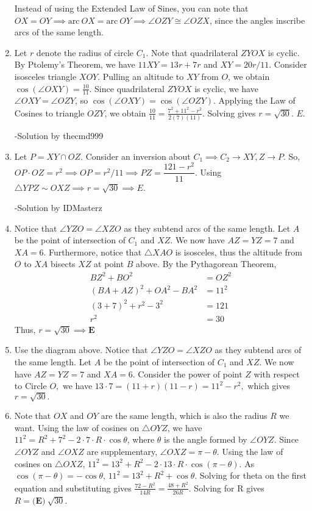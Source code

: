 \documentclass{article}%
\begin{document}
\begin{enumerate}
Instead of using the Extended Law of Sines, you can note that $OX = OY \implies \text{arc}\ OX =\text{arc}\ OY \implies \angle{OZY} \cong \angle{OZX}$, since the angles inscribe arcs of the same length.

%
\item%
Let $r$ denote the radius of circle $C_1$. Note that quadrilateral $ZYOX$ is cyclic. By Ptolemy's Theorem, we have $11XY=13r+7r$ and $XY=20r/11$. Consider isosceles triangle $XOY$. Pulling an altitude to $XY$ from $O$, we obtain $\cos(\angle{OXY}) = \frac{10}{11}$. Since quadrilateral $ZYOX$ is cyclic, we have $\angle{OXY}=\angle{OZY}$, so $\cos(\angle{OXY}) = \cos(\angle{OZY})$. Applying the Law of Cosines to triangle $OZY$, we obtain $\frac{10}{11} = \frac{7^2+11^2-r^2}{2(7)(11)}$. Solving gives $r=\sqrt{30}$. $\boxed{E}$.

-Solution by thecmd999

%
\item%
Let $P = XY \cap OZ$. Consider an inversion about $C_1 \implies C_2 \to XY, Z \to P$. So,  $OP \cdot OZ = r^2 \implies OP = r^2/11 \implies PZ = \dfrac{121 - r^2}{11}$. Using $\triangle YPZ \sim OXZ \implies  r = \sqrt{30} \implies \boxed{E}$.


-Solution by IDMasterz

%
\item%
Notice that $\angle YZO=\angle XZO$ as they subtend arcs of the same length. Let $A$ be the point of intersection of $C_1$ and $XZ$. We now have $AZ=YZ=7$ and $XA=6$. Furthermore, notice that $\triangle XAO$ is isosceles, thus the altitude from $O$ to $XA$ bisects $XZ$ at point $B$ above. By the Pythagorean Theorem, \begin{align*}BZ^2+BO^2&=OZ^2\\(BA+AZ)^2+OA^2-BA^2&=11^2\\(3+7)^2+r^2-3^2&=121\\r^2&=30\end{align*}Thus, $r=\sqrt{30}\implies\boxed{\textbf{E}}$

%
\item%
Use the diagram above. Notice that $\angle YZO=\angle XZO$ as they subtend arcs of the same length. Let $A$ be the point of intersection of $C_1$ and $XZ$. We now have $AZ=YZ=7$ and $XA=6$. Consider the power of point $Z$ with respect to Circle $O,$ we have $13\cdot 7 = (11 + r)(11 - r) = 11^2 - r^2,$ which gives $r=\boxed{\sqrt{30}}.$

%
\item%
Note that $OX$ and $OY$ are the same length, which is also the radius $R$ we want. Using the law of cosines on $\triangle OYZ$, we have $11^2=R^2+7^2-2\cdot 7 \cdot R \cdot \cos\theta$, where $\theta$ is the angle formed by $\angle{OYZ}$. Since $\angle{OYZ}$ and $\angle{OXZ}$ are supplementary, $\angle{OXZ}=\pi-\theta$. Using the law of cosines on $\triangle OXZ$, $11^2=13^2+R^2-2 \cdot 13 \cdot R \cdot \cos(\pi-\theta)$. As $\cos(\pi-\theta)=-\cos\theta$, $11^2=13^2+R^2+\cos\theta$. Solving for theta on the first equation and substituting gives $\frac{72-R^2}{14R}=\frac{48+R^2}{26R}$. Solving for R gives $R=\textbf{(E)}\ \boxed{\sqrt{30}}$.


\end{enumerate}
\end{document}
